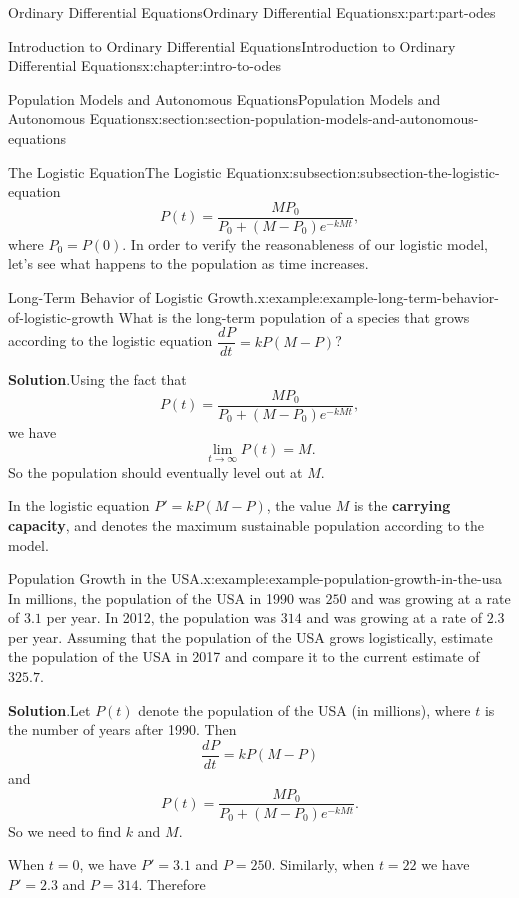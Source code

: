 \documentclass[oneside,10pt,]{book}
\newcommand{\blocktitlefont}{\relax}
\newcommand{\terminology}[1]{\textbf{#1}}
\numberwithin{equation}{part}
\newcommand{\dv}[3][]{\dfrac{d^{#1} #2}{d #3^{#1}}}
\begin{document}
\begin{partptx}{Ordinary Differential Equations}{}{Ordinary Differential Equations}{}{}{x:part:part-odes}
\begin{chapterptx}{Introduction to Ordinary Differential Equations}{}{Introduction to Ordinary Differential Equations}{}{}{x:chapter:intro-to-odes}
\begin{sectionptx}{Population Models and Autonomous Equations}{}{Population Models and Autonomous Equations}{}{}{x:section:section-population-models-and-autonomous-equations}
\begin{subsectionptx}{The Logistic Equation}{}{The Logistic Equation}{}{}{x:subsection:subsection-the-logistic-equation}
\begin{equation*}
P(t) = \frac{MP_{0}}{P_{0} + (M - P_{0})e^{-kMt}},
\end{equation*}
where \(P_{0} = P(0)\). In order to verify the reasonableness of our logistic model, let's see what happens to the population as time increases.%
\begin{example}{Long-Term Behavior of Logistic Growth.}{x:example:example-long-term-behavior-of-logistic-growth}%
What is the long-term population of a species that grows according to the logistic equation \(\dv{P}{t} = kP(M-P)\)?%
\par\smallskip%
\noindent\textbf{\blocktitlefont Solution}.\hypertarget{g:solution:idp105548780216864}{}\quad{}Using the fact that%
\begin{equation*}
P(t) = \frac{MP_{0}}{P_{0} + (M - P_{0})e^{-kMt}},
\end{equation*}
we have%
\begin{equation*}
\lim_{t\to\infty}P(t) = M.
\end{equation*}
So the population should eventually level out at \(M\).%
\end{example}
In the logistic equation \(P' = kP(M-P)\), the value \(M\) is the \terminology{carrying capacity}, and denotes the maximum sustainable population according to the model.%
\begin{example}{Population Growth in the USA.}{x:example:example-population-growth-in-the-usa}%
In millions, the population of the USA in 1990 was \(250\) and was growing at a rate of \(3.1\) per year. In 2012, the population was \(314\) and was growing at a rate of \(2.3\) per year. Assuming that the population of the USA grows logistically, estimate the population of the USA in 2017 and compare it to the current estimate of \(325.7\).%
\par\smallskip%
\noindent\textbf{\blocktitlefont Solution}.\hypertarget{g:solution:idp105548780222624}{}\quad{}Let \(P(t)\) denote the population of the USA (in millions), where \(t\) is the number of years after 1990. Then%
\begin{equation*}
\dv{P}{t} = kP(M-P)
\end{equation*}
and%
\begin{equation*}
P(t) = \frac{MP_{0}}{P_{0} + (M - P_{0})e^{-kMt}}.
\end{equation*}
So we need to find \(k\) and \(M\).%
\par
When \(t = 0\), we have \(P' = 3.1\) and \(P = 250\). Similarly, when \(t = 22\) we have \(P' = 2.3\) and \(P = 314\). Therefore%

\end{example}
\end{subsectionptx}
\end{sectionptx}
\end{chapterptx}
\end{partptx}
\end{document}
